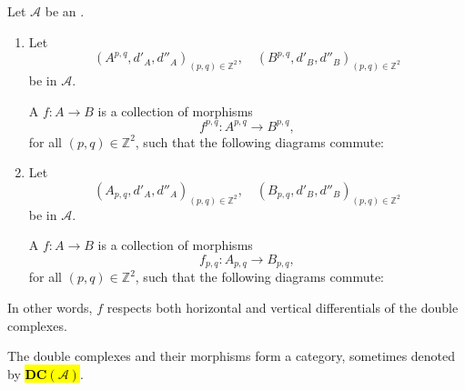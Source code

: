 \begin{definition} \label{definition:morphism_of_double_complex_of_objects_in_an_additive_category}
Let $\mathcal{A}$ be an . 
\begin{enumerate}
    \item Let
    $$(A^{p,q}, d'_A, d''_A)_{(p,q)\in \mathbb{Z}^2}, \quad (B^{p,q}, d'_B, d''_B)_{(p,q)\in \mathbb{Z}^2}$$
    be  in $\mathcal{A}$.

    A  $f : A \to B$ is a collection of morphisms
    $$ f^{p,q} : A^{p,q} \to B^{p,q}, $$
    for all $(p,q) \in \mathbb{Z}^2$, such that the following diagrams commute:


    \item Let
    $$(A_{p,q}, d'_A, d''_A)_{(p,q)\in \mathbb{Z}^2}, \quad (B_{p,q}, d'_B, d''_B)_{(p,q)\in \mathbb{Z}^2}$$
    be  in $\mathcal{A}$.

    A  $f : A \to B$ is a collection of morphisms
    $$ f_{p,q} : A_{p,q} \to B_{p,q}, $$
    for all $(p,q) \in \mathbb{Z}^2$, such that the following diagrams commute:


\end{enumerate}

In other words, $f$ respects both horizontal and vertical differentials of the double complexes.

The double complexes and their morphisms form a category, sometimes denoted by \hl{$\mathbf{DC}(\mathcal{A})$}.
\end{definition}